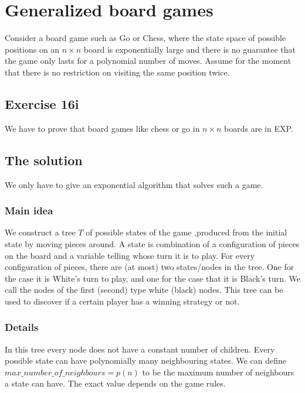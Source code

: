 \section*{Generalized board games}

Consider a board game such as Go or Chess, where the state space of possible
positions on an $n \times n$ board is exponentially large and there is no guarantee that the game
only lasts for a polynomial number of moves. Assume for the moment that there is no
restriction on visiting the same position twice.


\subsection*{Exercise 16i}

We have to prove that board games like chess or go in $n \times n$ boards are in EXP.

\subsection*{The solution}

We only have to give an exponential algorithm that solves such a
game.

\subsubsection*{Main idea}
We construct a tree $T$ of possible states of the game ,produced from the initial state by
moving pieces around. A state is combination of a configuration of pieces on the board
 and a variable telling whose turn it is to play. For every configuration of pieces, there are
 (at most) two states/nodes in the tree. One for the case it is White's turn to play, and one
for the case that it is Black's turn. We call the nodes of the first (second) type white (black) nodes.
This tree can be used to discover if a certain player
has a winning strategy or not.

\subsubsection*{Details}

In this tree every node does not have a constant number of children. Every possible state can have polynomially many
neighbouring states. We can define $max\_number\_of\_neighbours = p(n)$ to be the maximum number of neighbours a state can
have. The exact value depends on the game rules.

